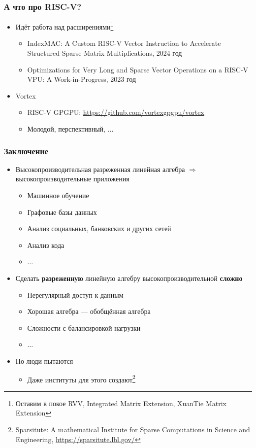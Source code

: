 \documentclass[xcolor=table,aspectratio=169]{beamer}
\begin{document}
\begin{frame}[fragile]
  \frametitle{А что про RISC-V?}
  \begin{itemize}    
    \item Идёт работа над расширениями\footnote{Оставим в покое RVV, Integrated Matrix Extension, XuanTie Matrix Extension}
    \begin{itemize}
      \item IndexMAC: A Custom RISC-V Vector Instruction to Accelerate Structured-Sparse Matrix Multiplications, 2024 год
      \item Optimizations for Very Long and Sparse Vector Operations on a RISC-V VPU: A Work-in-Progress, 2023 год
    \end{itemize}
    \item Vortex
    \begin{itemize}
      \item RISC-V GPGPU: \href{https://github.com/vortexgpgpu/vortex}{https://github.com/vortexgpgpu/vortex}
      \item Молодой, перспективный, $\ldots$
    \end{itemize}
  \end{itemize}
\end{frame}

\begin{frame}[fragile]
  \frametitle{Заключение}  
  \begin{itemize}
    \item Высокопроизводительная разреженная линейная алгебра $\Rightarrow$ высокопроизводительные приложения
    \begin{itemize}
      \item Машинное обучение
      \item Графовые базы данных
      \item Анализ социальных, банковских и других сетей
      \item Анализ кода
      \item $\ldots$
    \end{itemize}
    \item Сделать \textbf{разреженную} линейную алгебру высокопроизводительной \textbf{сложно}
    \begin{itemize}
      \item Нерегулярный доступ к данным
      \item Хорошая алгебра --- обобщённая алгебра
      \item Сложности с балансировкой нагрузки
      \item $\ldots$
    \end{itemize}
    \item Но люди пытаются
    \begin{itemize}
      \item Даже институты для этого создают\footnote{Sparsitute: A mathematical Institute for Sparse Computations in Science and Engineering, \href{https://sparsitute.lbl.gov/}{https://sparsitute.lbl.gov/}}
    \end{itemize}
  \end{itemize}
\end{frame}
\end{document}
